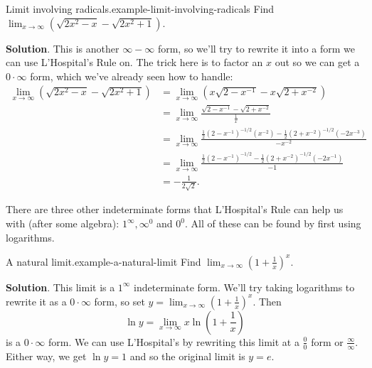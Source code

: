 \documentclass[10pt,]{book}
\numberwithin{equation}{section}
\begin{document}
\begin{example}{Limit involving radicals.}{example-limit-involving-radicals}%
\hypertarget{p-303}{}%
Find \(\lim_{x\to\infty}(\sqrt{2x^{2} - x} - \sqrt{2x^{2}+1})\).%
\par\smallskip%
\noindent\textbf{Solution}.\hypertarget{solution-68}{}\quad%
\hypertarget{p-304}{}%
This is another \(\infty-\infty\) form, so we'll try to rewrite it into a form we can use L'Hospital's Rule on. The trick here is to factor an \(x\) out so we can get a \(0\cdot\infty\) form, which we've already seen how to handle:%
\begin{align*}
\lim_{x\to\infty}(\sqrt{2x^{2} - x} - \sqrt{2x^{2} + 1}) & = \lim_{x\to\infty}(x\sqrt{2 - x^{-1}} - x\sqrt{2+x^{-2}}) \\
& = \lim_{x\to\infty}\frac{\sqrt{2 - x^{-1}} - \sqrt{2+x^{-2}}}{\frac{1}{x}} \\
& = \lim_{x\to\infty}\frac{\frac{1}{2}(2-x^{-1})^{-1/2}(x^{-2}) - \frac{1}{2}(2+x^{-2})^{-1/2}(-2x^{-3})}{-x^{-2}} \\
& = \lim_{x\to\infty}\frac{\frac{1}{2}(2 - x^{-1})^{-1/2} - \frac{1}{2}(2+x^{-2})^{-1/2}(-2x^{-1})}{-1} \\
& = -\frac{1}{2\sqrt{2}}.
\end{align*}
%
\end{example}
\hypertarget{p-305}{}%
There are three other indeterminate forms that L'Hospital's Rule can help us with (after some algebra): \(1^{\infty}, \infty^{0}\) and \(0^{0}\). All of these can be found by first using logarithms.%
\begin{example}{A natural limit.}{example-a-natural-limit}%
\hypertarget{p-306}{}%
Find \(\lim_{x\to\infty}\left(1+\frac{1}{x}\right)^{x}\).%
\par\smallskip%
\noindent\textbf{Solution}.\hypertarget{solution-69}{}\quad%
\hypertarget{p-307}{}%
This limit is a \(1^{\infty}\) indeterminate form. We'll try taking logarithms to rewrite it as a \(0\cdot\infty\) form, so set \(y = \lim_{x\to\infty}\left(1+\frac{1}{x}\right)^{x}\). Then%
\begin{equation*}
\ln y = \lim_{x\to\infty}x\ln\left(1+\frac{1}{x}\right)
\end{equation*}
is a \(0\cdot\infty\) form. We can use L'Hospital's by rewriting this limit at a \(\frac{0}{0}\) form or \(\frac{\infty}{\infty}\). Either way, we get \(\ln y = 1\) and so the original limit is \(y = e\).%
\end{example}
%
%
\typeout{************************************************}
\typeout{************************************************}
%
\end{document}
